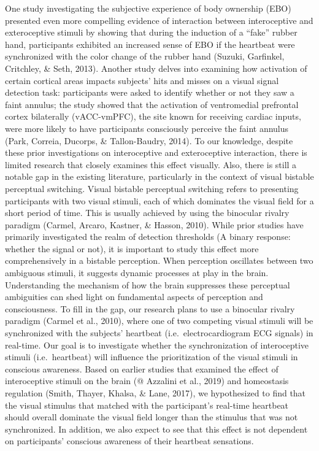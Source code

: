 \documentclass[
  man]{apa6}
\begin{document}
One study investigating the subjective experience of body ownership (EBO) presented even more compelling evidence of interaction between interoceptive and exteroceptive stimuli by showing that during the induction of a ``fake'' rubber hand, participants exhibited an increased sense of EBO if the heartbeat were synchronized with the color change of the rubber hand (Suzuki, Garfinkel, Critchley, \& Seth, 2013). Another study delves into examining how activation of certain cortical areas impacts subjects' hits and misses on a visual signal detection task: participants were asked to identify whether or not they saw a faint annulus; the study showed that the activation of ventromedial prefrontal cortex bilaterally (vACC-vmPFC), the site known for receiving cardiac inputs, were more likely to have participants consciously perceive the faint annulus (Park, Correia, Ducorps, \& Tallon-Baudry, 2014).
To our knowledge, despite these prior investigations on interoceptive and exteroceptive interaction, there is limited research that closely examines this effect visually. Also, there is still a notable gap in the existing literature, particularly in the context of visual bistable perceptual switching. Visual bistable perceptual switching refers to presenting participants with two visual stimuli, each of which dominates the visual field for a short period of time. This is usually achieved by using the binocular rivalry paradigm (Carmel, Arcaro, Kastner, \& Hasson, 2010). While prior studies have primarily investigated the realm of detection thresholds (A binary response: whether the signal or not), it is important to study this effect more comprehensively in a bistable perception. When perception oscillates between two ambiguous stimuli, it suggests dynamic processes at play in the brain. Understanding the mechanism of how the brain suppresses these perceptual ambiguities can shed light on fundamental aspects of perception and consciousness.
To fill in the gap, our research plans to use a binocular rivalry paradigm (Carmel et al., 2010), where one of two competing visual stimuli will be synchronized with the subjects' heartbeat (i.e.~electrocardiogram ECG signals) in real-time. Our goal is to investigate whether the synchronization of interoceptive stimuli (i.e.~heartbeat) will influence the prioritization of the visual stimuli in conscious awareness. Based on earlier studies that examined the effect of interoceptive stimuli on the brain (@ Azzalini et al., 2019) and homeostasis regulation (Smith, Thayer, Khalsa, \& Lane, 2017), we hypothesized to find that the visual stimulus that matched with the participant's real-time heartbeat should overall dominate the visual field longer than the stimulus that was not synchronized. In addition, we also expect to see that this effect is not dependent on participants' conscious awareness of their heartbeat sensations.
\end{document}
